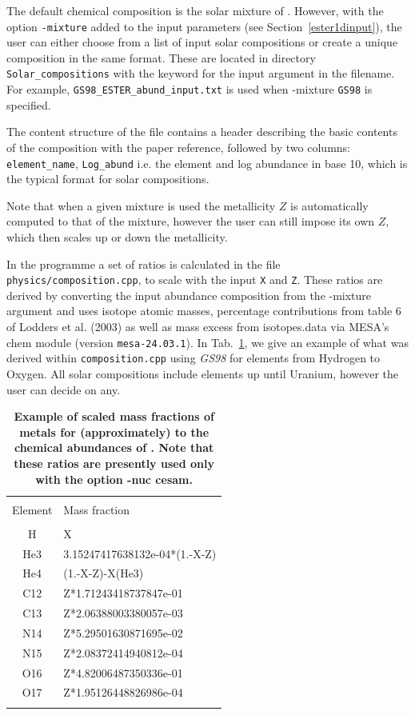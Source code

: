 The default chemical composition is the solar mixture of
\cite{GN93}. {However, with the option {\tt -mixture} added to the
input parameters (see Section~\ref{ester1dinput}), the user can
either choose from a list of input solar compositions or create a
unique composition in the same format. These are located in directory
\texttt{Solar\_compositions} with the keyword for the input argument
in the filename. For example, \texttt{GS98\_ESTER\_abund\_input.txt}
is used when -mixture {\tt GS98} is specified.}

The content structure of the file contains a header describing the basic
contents of the composition with the paper reference, followed by two
columns: {\tt element\_name}, {\tt Log\_abund} i.e. the element and log
abundance in base 10, which is the typical format for solar compositions.

Note that when a given mixture is used the metallicity $Z$ is automatically
computed to that of the mixture, however the user can still impose its own $Z$,
which then scales up or down the metallicity.

In the programme a set of ratios is calculated in the file {\tt
physics/composition.cpp}, to scale with the input {\tt X} and
{\tt Z}. These ratios are derived by converting the input abundance
composition from the {-mixture} argument and uses isotope atomic masses,
percentage contributions from table 6 of Lodders et al. (2003) as
well as mass excess from isotopes.data via MESA's chem module (version
\texttt{mesa-24.03.1}). In Tab.~\ref{tab:exa_mf}, we give an example of
what was derived within \texttt{composition.cpp} using \textit{GS98}
for elements from Hydrogen to Oxygen. All solar compositions include
elements up until Uranium, however the user can decide on any.


\begin{table}[t]
    \centering
\begin{tabular}{c|l}
\hline
	   &   \\
	Element & Mass fraction \\
	   &   \\
        H  & X \\
        He3  & 3.15247417638132e-04*(1.-X-Z) \\
        He4  & (1.-X-Z)-X(He3) \\
        C12  & Z*1.71243418737847e-01 \\
        C13  & Z*2.06388003380057e-03 \\
        N14  & Z*5.29501630871695e-02 \\
        N15  & Z*2.08372414940812e-04 \\
        O16  & Z*4.82006487350336e-01 \\
        O17  & Z*1.95126448826986e-04 \\
	   &   \\
\hline
\end{tabular}
    \caption{\bf Example of scaled mass fractions of metals for (approximately) to the chemical
abundances of \cite{GS98}. Note that these ratios are presently used only with the option -nuc cesam.}
    \label{tab:exa_mf}
\end{table}

